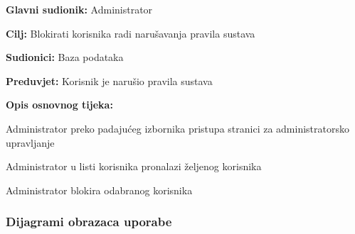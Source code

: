 					\noindent {}
					\begin{packed_item}
						
						\item \textbf{Glavni sudionik: } Administrator
						\item  \textbf{Cilj:} Blokirati korisnika radi narušavanja pravila sustava
						\item  \textbf{Sudionici:} Baza podataka
						\item  \textbf{Preduvjet:} Korisnik je narušio pravila sustava
						\item  \textbf{Opis osnovnog tijeka:}
						
						\item[] \begin{packed_enum}
							
							\item Administrator preko padajućeg izbornika pristupa stranici za administratorsko upravljanje
							\item Administrator u listi korisnika pronalazi željenog korisnika
							\item Administrator blokira odabranog korisnika
							
						\end{packed_enum}
					\end{packed_item}	
				\eject				
				\subsubsection{Dijagrami obrazaca uporabe}
					
